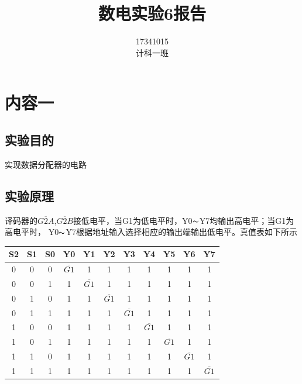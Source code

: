 \documentclass[11pt,UTF8]{ctexart}
\title{数电实验6报告}
\author{17341015\quad数据科学与计算机学院\\计科一班\quad陈鸿峥}
\date{}
\begin{document}
\maketitle
\vspace{-50pt}%
\lstset{language=C++,escapechar=`}

\section{内容一}
\subsection{实验目的}
实现数据分配器的电路

\subsection{实验原理}
译码器的$\overline{G2A}$,$\overline{G2B}$接低电平，当G1为低电平时，Y0$\thicksim$Y7均输出高电平；当G1为高电平时， Y0$\thicksim$Y7根据地址输入选择相应的输出端输出低电平。真值表如下所示
\begin{table}[H]
  \centering
    \begin{tabular}{|c|c|c|c|c|c|c|c|c|c|c|}
    \hline
    S2    & S1    & S0    & Y0    & Y1    & Y2    & Y3    & Y4    & Y5    & Y6    & Y7 \bigstrut\\
    \hline
    0     & 0     & 0     & $\overline{G1}$    & 1     & 1     & 1     & 1     & 1     & 1     & 1 \bigstrut\\
    \hline
    0     & 0     & 1     & 1     & $\overline{G1}$    & 1     & 1     & 1     & 1     & 1     & 1 \bigstrut\\
    \hline
    0     & 1     & 0     & 1     & 1     & $\overline{G1}$    & 1     & 1     & 1     & 1     & 1 \bigstrut\\
    \hline
    0     & 1     & 1     & 1     & 1     & 1     & $\overline{G1}$    & 1     & 1     & 1     & 1 \bigstrut\\
    \hline
    1     & 0     & 0     & 1     & 1     & 1     & 1     & $\overline{G1}$    & 1     & 1     & 1 \bigstrut\\
    \hline
    1     & 0     & 1     & 1     & 1     & 1     & 1     & 1     & $\overline{G1}$    & 1     & 1 \bigstrut\\
    \hline
    1     & 1     & 0     & 1     & 1     & 1     & 1     & 1     & 1     & $\overline{G1}$    & 1 \bigstrut\\
    \hline
    1     & 1     & 1     & 1     & 1     & 1     & 1     & 1     & 1     & 1     & $\overline{G1}$ \bigstrut\\
    \hline
    \end{tabular}%
\end{table}%
\end{document}
